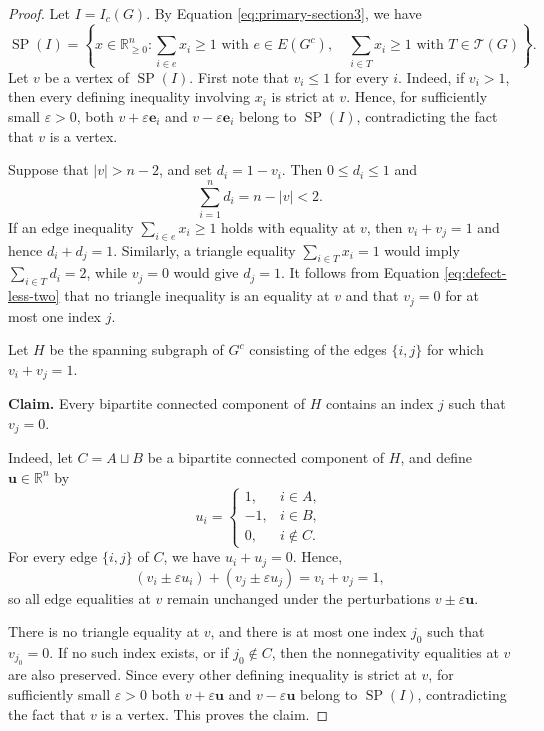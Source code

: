 \documentclass[12pt]{amsart}
\begin{document}
\begin{proof}
Let $I=I_c(G)$. By Equation \eqref{eq:primary-section3}, we have
\[
\operatorname{SP}(I)=\left\{x\in\mathbb R_{\ge0}^n:\sum_{i\in e}x_i\ge1 \text{ with } e\in E(G^c),\quad \sum_{i\in T}x_i\ge1 \text{ with } T\in\mathcal T(G) \right\}.
\]
Let $v$ be a vertex of $\operatorname{SP}(I)$. First note that $v_i\le1$ for every $i$. Indeed, if $v_i>1$, then every defining inequality involving $x_i$ is strict at $v$. Hence, for sufficiently small $\varepsilon>0$, both $v+\varepsilon\mathbf e_i$ and $v-\varepsilon\mathbf e_i$ belong to $\operatorname{SP}(I)$, contradicting the fact that $v$ is a vertex.

Suppose that $|v|>n-2$, and set $d_i=1-v_i$. Then $0\le d_i\le1$ and
\begin{equation}\label{eq:defect-less-two}
\sum_{i=1}^n d_i=n-|v|<2.
\end{equation}
If an edge inequality $\sum_{i\in e}x_i\ge1$ holds with equality at $v$, then $v_i+v_j=1$ and hence $d_i+d_j=1$. Similarly, a triangle equality $\sum_{i\in T}x_i =1$ would imply $\sum_{i\in T}d_i=2$, while $v_j=0$ would give $d_j=1$. It follows from Equation \eqref{eq:defect-less-two} that no triangle inequality is an equality at $v$ and that $v_j=0$ for at most one index $j$.

Let $H$ be the spanning subgraph of $G^c$ consisting of the edges $\{i,j\}$ for which $v_i+v_j=1$. 

\medskip
\noindent\textbf{Claim.}
Every bipartite connected component of \(H\) contains an index
\(j\) such that \(v_j=0\).

\smallskip
 Indeed, let \(C=A\sqcup B\) be a bipartite connected component of \(H\), and
define \(\boldsymbol u\in\mathbb R^n\) by
\[
u_i=
\begin{cases}
1, & i\in A,\\
-1, & i\in B,\\
0, & i\notin C.
\end{cases}
\]
For every edge \(\{i,j\}\) of \(C\), we have \(u_i+u_j=0\). Hence,
\[
(v_i\pm\varepsilon u_i)+(v_j\pm\varepsilon u_j)
=v_i+v_j=1,
\]
so all edge equalities at \(v\) remain unchanged under the
perturbations \(v\pm\varepsilon\boldsymbol u\).

There is no triangle equality at \(v\), and there is at most one
index \(j_0\) such that \(v_{j_0}=0\). If no such index exists, or if
\(j_0\notin C\), then the nonnegativity equalities at \(v\) are also
preserved. Since every other defining inequality is strict
at \(v\), for sufficiently small \(\varepsilon>0\) both \(v+\varepsilon\boldsymbol u \) and \(v-\varepsilon\boldsymbol u \) belong to \(\operatorname{SP}(I)\), contradicting the fact that \(v\) is a vertex. This proves the claim.


\end{proof}
\end{document}
